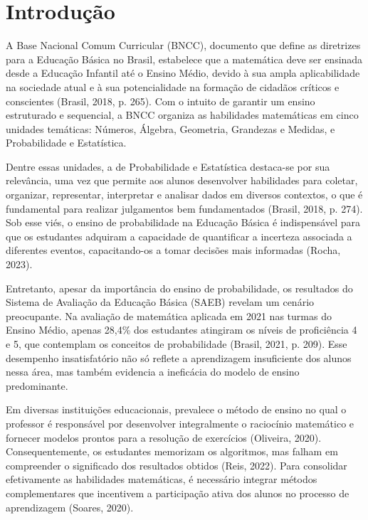 \chapter{Introdução}
\label{introducao}

A Base Nacional Comum Curricular (BNCC), documento que define as diretrizes para a Educação Básica no Brasil, estabelece que a matemática deve ser ensinada desde a Educação Infantil até o Ensino Médio, devido à sua ampla aplicabilidade na sociedade atual e à sua potencialidade na formação de cidadãos críticos e conscientes (Brasil, 2018, p. 265). Com o intuito de garantir um ensino estruturado e sequencial, a BNCC organiza as habilidades matemáticas em cinco unidades temáticas: Números, Álgebra, Geometria, Grandezas e Medidas, e Probabilidade e Estatística.

Dentre essas unidades, a de Probabilidade e Estatística destaca-se por sua relevância, uma vez que permite aos alunos desenvolver habilidades para coletar, organizar, representar, interpretar e analisar dados em diversos contextos, o que é fundamental para realizar julgamentos bem fundamentados (Brasil, 2018, p. 274). Sob esse viés, o ensino de probabilidade na Educação Básica é indispensável para que os estudantes adquiram a capacidade de quantificar a incerteza associada a diferentes eventos, capacitando-os a tomar decisões mais informadas (Rocha, 2023).

Entretanto, apesar da importância do ensino de probabilidade, os resultados do Sistema de Avaliação da Educação Básica (SAEB) revelam um cenário preocupante. Na avaliação de matemática aplicada em 2021 nas turmas do Ensino Médio, apenas 28,4\% dos estudantes atingiram os níveis de proficiência 4 e 5,  que contemplam os conceitos de probabilidade (Brasil, 2021, p. 209). Esse desempenho insatisfatório não só reflete a aprendizagem insuficiente dos alunos nessa área, mas também evidencia a ineficácia do modelo de ensino predominante. 

Em diversas instituições educacionais, prevalece o método de ensino no qual o professor é responsável por desenvolver integralmente o raciocínio matemático e fornecer modelos prontos para a resolução de exercícios (Oliveira, 2020). Consequentemente, os estudantes memorizam os algoritmos, mas falham em compreender o significado dos resultados obtidos (Reis, 2022). Para consolidar efetivamente as habilidades matemáticas, é necessário integrar métodos complementares que incentivem a participação ativa dos alunos no processo de aprendizagem (Soares, 2020).

